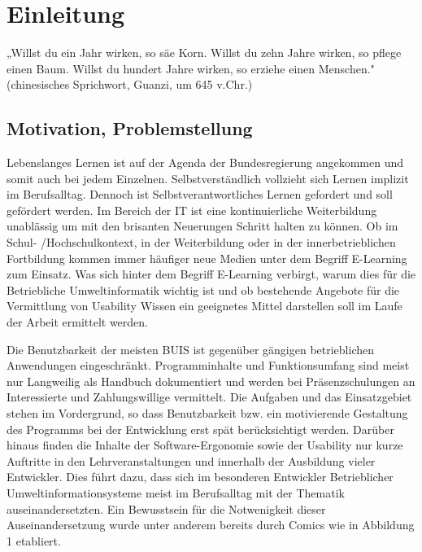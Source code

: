 \documentclass[a4paper, 12pt, twoside, BCOR=20mm, DIV=calc, abstracton, parskip=half*, toc=bibliography, toc=listof, headsepline, footsepline, headings=small, numbers=enddot]{scrreprt}
\begin{document}

%

\tableofcontents


\chapter{Einleitung} %
„Willst du ein Jahr wirken, so säe Korn. Willst du zehn Jahre wirken, so pflege einen Baum. Willst du hundert Jahre wirken, so erziehe einen Menschen."
(chinesisches Sprichwort, Guanzi, um 645 v.Chr.)

\section{Motivation, Problemstellung}
Lebenslanges Lernen ist auf der Agenda der Bundesregierung angekommen und somit auch bei jedem Einzelnen. Selbstverständlich vollzieht sich Lernen implizit im Berufsalltag. Dennoch ist Selbstverantwortliches Lernen gefordert und soll gefördert werden\cite{BLK}. Im Bereich der \ac{IT} ist eine kontinuierliche Weiterbildung unablässig um mit den brisanten Neuerungen Schritt halten zu können. Ob im Schul- /Hochschulkontext, in der Weiterbildung oder in der innerbetrieblichen Fortbildung kommen immer häufiger neue Medien unter dem Begriff E-Learning %
zum Einsatz. Was sich hinter dem Begriff E-Learning verbirgt, warum dies für die Betriebliche Umweltinformatik wichtig ist und ob bestehende Angebote für die Vermittlung von Usability Wissen ein geeignetes Mittel darstellen soll im Laufe der Arbeit ermittelt werden. 
 
Die Benutzbarkeit der meisten \ac{BUIS} ist gegenüber gängigen betrieblichen Anwendungen eingeschränkt. Programminhalte und Funktionsumfang sind meist nur Langweilig als Handbuch dokumentiert und werden bei Präsenzschulungen an Interessierte und Zahlungswillige vermittelt. Die Aufgaben und das Einsatzgebiet stehen im Vordergrund, so dass Benutzbarkeit bzw. ein motivierende Gestaltung des Programms bei der Entwicklung erst spät berücksichtigt werden.  
Darüber hinaus finden die Inhalte der Software-Ergonomie sowie der Usability nur kurze Auftritte in den Lehrveranstaltungen und innerhalb der Ausbildung vieler Entwickler. Dies führt dazu, dass sich im besonderen Entwickler Betrieblicher Umweltinformationsysteme meist im Berufsalltag mit der Thematik auseinandersetzten. Ein Bewusstsein für die Notwenigkeit dieser Auseinandersetzung wurde unter anderem bereits durch Comics wie in Abbildung 1 etabliert.
\end{document}
